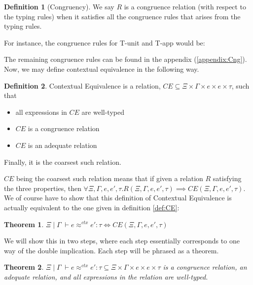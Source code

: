 \documentclass[twoside,11pt,openright]{report}
\newtheorem{theorem}{Theorem}
\theoremstyle{definition}
\newtheorem{definition}{Definition}[section]
\newcommand{\expr}{e}
\newcommand{\TT}{()}
\newcommand{\Tvar}{X}
\newcommand{\Tapp}[1]{#1\;\_}
\newcommand{\subst}[3]{#1{\left[#3 \middle/ #2 \right]}}
\newcommand{\Tunit}{\mathsf{Unit}}
\newcommand{\Tall}[2]{\forall #1.\; #2}
\newcommand{\typ}{\tau}
\newcommand{\venv}{\Gamma}
\newcommand{\tenv}{\Xi}
\newcommand{\jdgRel}[6]{#1 \; | \; #2 \; \vdash #3 \approx^{#4} #5 : #6}
\newcommand{\ctxRel}[5]{\jdgRel{#1}{#2}{#3}{ctx}{#4}{#5}}
\begin{document}
\begin{definition}[Congruency]
  We say $R$ is a congruence relation (with respect to the typing rules) when it satisfies all the congruence rules that arises from the typing rules.
\end{definition}
For instance, the congruence rules for T-unit and T-app would be:
The remaining congruence rules can be found in the appendix (\ref{appendix:Cng}).\\
Now, we may define contextual equivalence in the following way.
\begin{definition}\label{def:CE2}
  Contextual Equivalence is a relation, $CE \subseteq \tenv \times \venv \times \expr \times \expr \times \typ$, such that
  \begin{itemize}
    \item all expressions in $CE$ are well-typed
    \item $CE$ is a congruence relation
    \item $CE$ is an adequate relation
  \end{itemize}
  Finally, it is the coarsest such relation.
\end{definition}
$CE$ being the coarsest such relation means that if given a relation $R$ satisfying the three properties, then $\forall \tenv, \venv, \expr, \expr', \typ . R(\tenv, \venv, \expr, \expr', \typ) \implies CE(\tenv, \venv, \expr, \expr', \typ)$.\\
We of course have to show that this definition of Contextual Equivalence is actually equivalent to the one given in definition \ref{def:CE}:
\begin{theorem}\label{thm:CE_eq}
  $\ctxRel{\tenv}{\venv}{\expr}{\expr'}{\typ} \iff CE(\tenv, \venv, \expr, \expr', \typ)$
\end{theorem}
We will show this in two steps, where each step essentially corresponds to one way of the double implication. Each step will be phrased as a theorem.
\begin{theorem}\label{thm:CE_eq_part1}
  $\ctxRel{\tenv}{\venv}{\expr}{\expr'}{\typ} \subseteq \tenv \times \venv \times \expr \times \expr \times \typ$ is a congruence relation, an adequate relation, and all expressions in the relation are well-typed.
\end{theorem}
\end{document}

